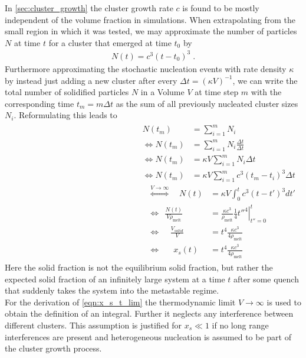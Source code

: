 In \autoref{sec:cluster_growth} the cluster growth rate $c$ is found to be mostly independent of the volume fraction in simulations. When extrapolating from the small region in which it was tested, we may approximate the number of particles $N$ at time $t$ for a cluster that emerged at time $t_0$ by
\begin{align}
\label{eqn:simple_growth}
N(t) = c^3 (t-t_0)^3 \; \text{.}
\end{align} 
Furthermore approximating the stochastic nucleation events with rate density $\kappa$ by instead just adding a new cluster after every $\Delta t = (\kappa V)^{-1}$, we can write the total number of solidified particles $N$ in a Volume $V$ at time step $m$ with the corresponding time $t_m = m \Delta t$ as the sum of all previously nucleated cluster sizes $N_i$. Reformulating this leads to
\begin{align}
\begin{split}
N(t_m)&=\sum_{i=1}^m N_i\\
\Leftrightarrow N(t_m)&=\sum_{i=1}^m N_i \frac{\Delta t}{\Delta t}\\
\Leftrightarrow N(t_m)&=\kappa V \sum_{i=1}^m N_i \Delta t\\
\Leftrightarrow N(t_m)&=\kappa V \sum_{i=1}^m c^3 (t_m-t_i)^3 \Delta t
\end{split}
\begin{split}
\label{eqn:x_s_t_lim}
\stackrel{V \rightarrow \infty } {\Leftrightarrow} \quad N(t)&=\kappa V \int_0^{t} c^3 (t - t')^3 d t'\\
\Leftrightarrow \; \, \frac{N(t)}{V \rho_{\text{melt}}}&=\frac{\kappa c^3}{\rho_{\text{melt}}} \left. \frac{1}{4}t''^4 \right|_{t''=0}^t\\
\Leftrightarrow \; \; \; \; \frac{V_{solid}}{V} &= t^4 \frac{\kappa c^3}{4 \rho_{\text{melt}}}\\
\Leftrightarrow \quad \; \: x_s(t)&= t^4 \frac{\kappa c^3}{4 \rho_{\text{melt}}}
\end{split}
\end{align}
Here the solid fraction is not the equilibrium solid fraction, but rather the expected solid fraction of an infinitely large system at a time $t$ after some quench that suddenly takes the system into the metastable regime.\\ 
For the derivation of \autoref{eqn:x_s_t_lim} the thermodynamic limit $V\rightarrow \infty$ is used to obtain the definition of an integral. Further it neglects any interference between different clusters. This assumption is justified for $x_s \ll 1$ if no long range interferences are present and heterogeneous nucleation is assumed to be part of the cluster growth process.\\

